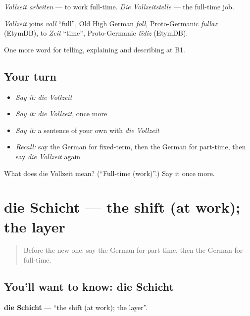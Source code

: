\emph{Vollzeit arbeiten} — to work full-time. \emph{Die Vollzeitstelle} — the full-time job.

\begin{cousinweb}
\emph{Vollzeit} joins \emph{voll} \textquotedblleft{}full\textquotedblright{}, Old High German \emph{foll}, Proto-Germanic \emph{fullaz} (EtymDB), to \emph{Zeit} \textquotedblleft{}time\textquotedblright{}, Proto-Germanic \emph{tīdiz} (EtymDB).
\end{cousinweb}

\begin{grammarlens}[title={What you've built}]
One more word for telling, explaining and describing at B1.
\end{grammarlens}

\subsection*{Your turn}
\begin{itemize}
\raggedright
  \item \emph{Say it:} \emph{die Vollzeit}
  \item \emph{Say it:} \emph{die Vollzeit}, once more
  \item \emph{Say it:} a sentence of your own with \emph{die Vollzeit}
  \item \emph{Recall:} say the German for fixed-term, then the German for part-time, then say \emph{die Vollzeit} again
\end{itemize}

\begin{tcolorbox}[breakable,colback=teal!4,colframe=teal!35!black,title={Before you move on}]
What does die Vollzeit mean? (\textquotedblleft{}Full-time (work)\textquotedblright{}.) Say it once more.
\end{tcolorbox}
\section[die Schicht]{die Schicht — the shift (at work); the layer}

\label{lesson:GE-C351-schicht}



\begin{quote}
Before the new one: say the German for part-time, then the German for full-time.
\end{quote}

\subsection*{You'll want to know: die Schicht}
\textbf{die Schicht} — \textquotedblleft{}the shift (at work); the layer\textquotedblright{}.

